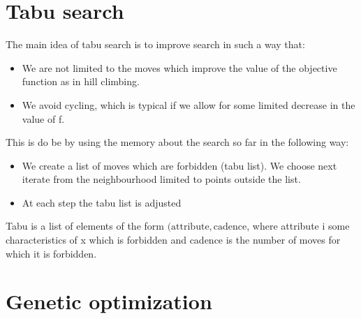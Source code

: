 \section{Tabu search}
The main idea of tabu search is to improve search in such a way that:
\begin{itemize}
        \item  We are not limited to the moves which improve the value of the objective function as in hill climbing.
        \item We avoid cycling, which is typical if we allow for some limited decrease in the value of f.
\end{itemize}

This is do be by using the memory about the search so far in the following way:
\begin{itemize}
        \item  We create a list of moves which are forbidden (tabu list). We choose next iterate from the neighbourhood limited to points outside the list.
        \item At each step the tabu list is adjusted
        
\end{itemize}

{
    Tabu is a list of elements of the form $(\text{attribute}, \text{cadence}$, where attribute i some characteristics of x which is forbidden and cadence is the number of moves for which it is forbidden.
}


\section{Genetic optimization}

